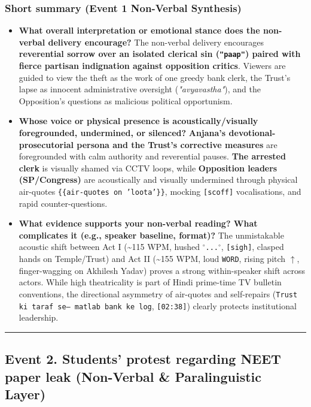 \documentclass[10pt,a4paper]{article}
\begin{document}
\subsubsection*{Short summary (Event 1 Non-Verbal Synthesis)}

\begin{itemize}
  \item \textbf{What overall interpretation or emotional stance does the non-verbal delivery encourage?}
The non-verbal delivery encourages \textbf{reverential sorrow over an isolated clerical sin (\texttt{"paap"}) paired with fierce partisan indignation against opposition critics}. Viewers are guided to view the theft as the work of one greedy bank clerk, the Trust's lapse as innocent administrative oversight (\textit{"avyavastha"}), and the Opposition's questions as malicious political opportunism.\par\smallskip
  \item \textbf{Whose voice or physical presence is acoustically/visually foregrounded, undermined, or silenced?}
\textbf{Anjana's devotional-prosecutorial persona and the Trust's corrective measures} are foregrounded with calm authority and reverential pauses. \textbf{The arrested clerk} is visually shamed via CCTV loops, while \textbf{Opposition leaders (SP/Congress)} are acoustically and visually undermined through physical air-quotes \texttt{\{\{air-quotes on 'loota'\}\}}, mocking \texttt{[scoff]} vocalisations, and rapid counter-questions.\par\smallskip
  \item \textbf{What evidence supports your non-verbal reading? What complicates it (e.g., speaker baseline, format)?}
The unmistakable acoustic shift between Act I (\textasciitilde{}115 WPM, hushed \texttt{$^\circ$...$^\circ$}, \texttt{[sigh]}, clasped hands on Temple/Trust) and Act II (\textasciitilde{}155 WPM, loud \texttt{WORD}, rising pitch \texttt{$\uparrow$}, finger-wagging on Akhilesh Yadav) proves a strong within-speaker shift across actors. While high theatricality is part of Hindi prime-time TV bulletin conventions, the directional asymmetry of air-quotes and self-repairs (\texttt{Trust ki taraf se--- matlab bank ke log}, \texttt{[02:38]}) clearly protects institutional leadership.\par\smallskip
\end{itemize}

\bigskip\hrule\bigskip

\subsection*{Event 2. Students' protest regarding NEET paper leak (Non-Verbal \& Paralinguistic Layer)}
\end{document}
